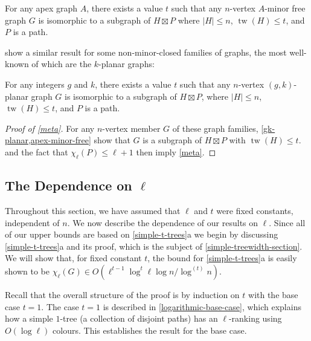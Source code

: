 \documentclass[kpfonts]{patmorin}
\DeclareMathOperator{\tw}{tw}
\newcommand{\lrn}{\chi_{\ell}}
\theoremstyle{named}
\newcommand{\weirdref}[2]{\cref{#1}#2}
\begin{document}
\begin{thm}\label{apex-minor-free}
    For any apex graph $A$, there exists a value $t$ such that any $n$-vertex $A$-minor free graph $G$ is isomorphic to a subgraph of $H\boxtimes P$ where $|H|\le n$, $\tw(H)\le t$, and $P$ is a path.
\end{thm}

\citet{dujmovic.morin.ea:structure} show a similar result for some non-minor-closed families of graphs, the most well-known of which are the $k$-planar graphs:

\begin{thm}\label{gk-planar}
    For any integers $g$ and $k$, there exists a value $t$ such that any $n$-vertex $(g,k)$-planar graph $G$ is isomorphic to a subgraph of $H\boxtimes P$, where $|H|\le n$, $\tw(H)\le t$, and $P$ is a path.
\end{thm}

\begin{proof}[Proof of \cref{meta}]
    For any $n$-vertex member $G$ of these graph families, \cref{gk-planar,apex-minor-free} show that $G$ is a subgraph of $H\boxtimes P$ with $\tw(H)\le t$.   and the fact that $\lrn(P)\le \ell+1$ then imply \cref{meta}.
\end{proof}

\subsection{The Dependence on $\ell$}
\label{dependence-on-ell}

Throughout this section, we have assumed that $\ell$ and $t$ were fixed constants, independent of $n$.  We now describe the dependence of our results on $\ell$.  Since all of our upper bounds are based on \weirdref{simple-t-trees}{a} we begin by discussing \weirdref{simple-t-trees}{a} and its proof, which is the subject of \cref{simple-treewidth-section}.  We will show that, for fixed constant $t$, the bound for \weirdref{simple-t-trees}{a} is easily shown to be $\lrn(G)\in O(\ell^{t-1}\log^t\ell \log n/\log^{(t)} n)$.

Recall that the overall structure of the proof is by induction on $t$ with the base case $t=1$.  The case $t=1$ is described in \cref{logarithmic-base-case}, which explains how a simple $1$-tree (a collection of disjoint paths) has an $\ell$-ranking using $O(\log\ell)$ colours.  This establishes the result for the base case.
\end{document}
